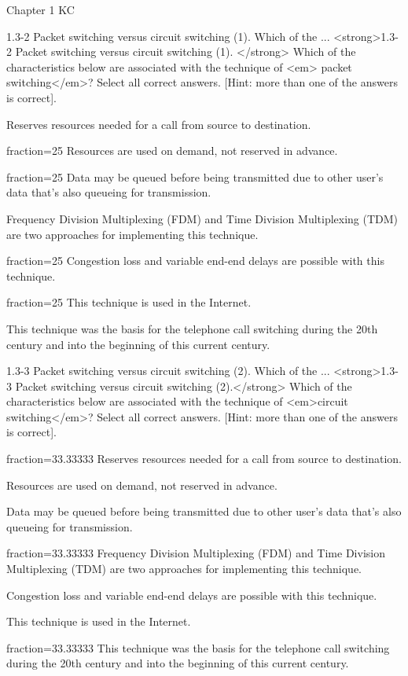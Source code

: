 \documentclass[a4paper]{article}
\begin{document}
\begin{quiz}{Chapter 1 KC}
\begin{multi}[points=1,multiple]{1.3-2 Packet switching versus circuit switching (1).  Which of the ...}
<strong>1.3-2 Packet switching versus circuit switching (1). </strong> Which of the characteristics below are associated with the technique of <em> packet switching</em>? Select all correct answers. [Hint: more than one of the answers is correct].
\item Reserves resources needed for a call from source to destination.
\item[fraction=25] Resources are used on demand, not reserved in advance.
\item[fraction=25] Data may be queued before being transmitted due to other user’s data that’s also queueing for transmission.
\item Frequency Division Multiplexing (FDM) and Time Division Multiplexing (TDM) are two approaches for implementing this technique.
\item[fraction=25] Congestion loss and variable end-end delays are possible with this technique.
\item[fraction=25] This technique is used in the Internet.
\item This technique was the basis for the telephone call switching during the 20th century and into the beginning of this current century.
\end{multi}

\begin{multi}[points=1,multiple]{1.3-3 Packet switching versus circuit switching (2).  Which of the ...}
<strong>1.3-3 Packet switching versus circuit switching (2).</strong>  Which of the characteristics below are associated with the technique of <em>circuit switching</em>? Select all correct answers. [Hint: more than one of the answers is correct].
\item[fraction=33.33333] Reserves resources needed for a call from source to destination.
\item Resources are used on demand, not reserved in advance.
\item Data may be queued before being transmitted due to other user’s data that’s also queueing for transmission.
\item[fraction=33.33333] Frequency Division Multiplexing (FDM) and Time Division Multiplexing (TDM) are two approaches for implementing this technique.
\item Congestion loss and variable end-end delays are possible with this technique.
\item This technique is used in the Internet.
\item[fraction=33.33333] This technique was the basis for the telephone call switching during the 20th century and into the beginning of this current century.
\end{multi}


\end{quiz}
\end{document}
